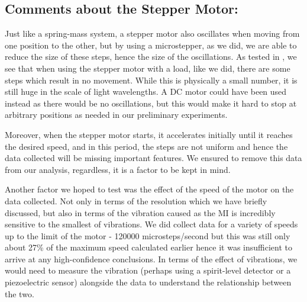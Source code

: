 \documentclass[journal]{Imperial_lab_report}
\begin{document}
\subsection{Comments about the Stepper Motor:}
Just like a spring-mass system, a stepper motor also oscillates when moving from one position to the other, but by using a microstepper, as we did, we are able to reduce the size of these steps, hence the size of the oscillations. As tested in \cite{microstep_cons}, we see that when using the stepper motor with a load, like we did, there are some steps which result in no movement. While this is physically a small number, it is still huge in the scale of light wavelengths. A DC motor could have been used instead as there would be no oscillations, but this would make it hard to stop at arbitrary positions as needed in our preliminary experiments.

Moreover, when the stepper motor starts, it accelerates initially until it reaches the desired speed, and in this period, the steps are not uniform and hence the data collected will be missing important features. We ensured to remove this data from our analysis, regardless, it is a factor to be kept in mind.

Another factor we hoped to test was the effect of the speed of the motor on the data collected. Not only in terms of the resolution which we have briefly discussed, but also in terms of the vibration caused as the MI is incredibly sensitive to the smallest of vibrations. We did collect data for a variety of speeds up to the limit of the motor - 120000 microsteps/second but this was still only about 27\% of the maximum speed calculated earlier hence it was insufficient to arrive at any high-confidence conclusions. In terms of the effect of vibrations, we would need to measure the vibration (perhaps using a spirit-level detector or a piezoelectric sensor) alongside the data to understand the relationship between the two.



\vspace{-5pt}
\end{document}
